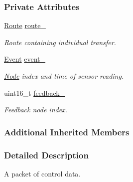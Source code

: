\subsubsection*{Private Attributes}
\begin{DoxyCompactItemize}
\item 
\mbox{\label{classosse_1_1collaborate_1_1_packet_forward_a6e1aebd75f31a98f1effe8011480607d}} 
\hyperlink{classosse_1_1collaborate_1_1_packet_forward_a5b42a7c3605c5a6c7e0880599b213240}{Route} \hyperlink{classosse_1_1collaborate_1_1_packet_forward_a6e1aebd75f31a98f1effe8011480607d}{route\+\_\+}
\begin{DoxyCompactList}\small\item\em Route containing individual transfer. \end{DoxyCompactList}\item 
\mbox{\label{classosse_1_1collaborate_1_1_packet_forward_ada88ba82c98c358b3c5200300d322f9e}} 
\hyperlink{classosse_1_1collaborate_1_1_packet_forward_a66c37a806c4b486cb1af64409865fa4b}{Event} \hyperlink{classosse_1_1collaborate_1_1_packet_forward_ada88ba82c98c358b3c5200300d322f9e}{event\+\_\+}
\begin{DoxyCompactList}\small\item\em \hyperlink{classosse_1_1collaborate_1_1_node}{Node} index and time of sensor reading. \end{DoxyCompactList}\item 
\mbox{\label{classosse_1_1collaborate_1_1_packet_forward_a93607aa047ad213bc9938374dcbe1e64}} 
uint16\+\_\+t \hyperlink{classosse_1_1collaborate_1_1_packet_forward_a93607aa047ad213bc9938374dcbe1e64}{feedback\+\_\+}
\begin{DoxyCompactList}\small\item\em Feedback node index. \end{DoxyCompactList}\end{DoxyCompactItemize}
\subsubsection*{Additional Inherited Members}


\subsubsection{Detailed Description}
A packet of control data. 

